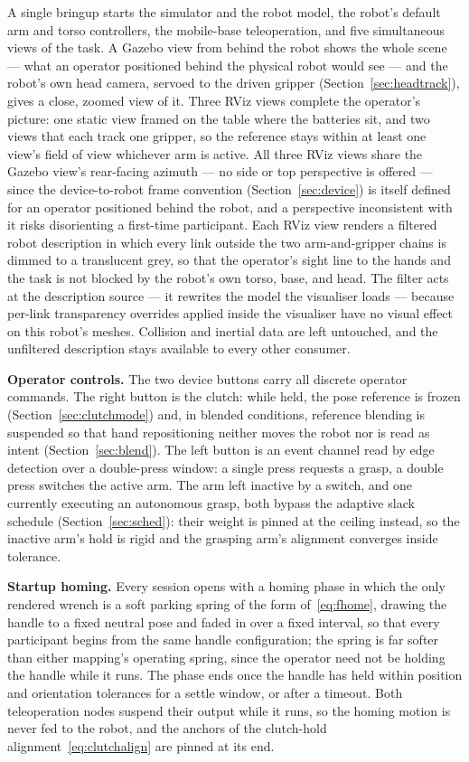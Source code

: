 \documentclass[12pt,a4paper,twoside,openright]{report}
\begin{document}
A single bringup starts the simulator and the robot model, the robot's default arm and torso controllers, the mobile-base teleoperation, and five simultaneous views of the task. A Gazebo view from behind the robot shows the whole scene --- what an operator positioned behind the physical robot would see --- and the robot's own head camera, servoed to the driven gripper (Section~\ref{sec:headtrack}), gives a close, zoomed view of it. Three RViz views complete the operator's picture: one static view framed on the table where the batteries sit, and two views that each track one gripper, so the reference stays within at least one view's field of view whichever arm is active. All three RViz views share the Gazebo view's rear-facing azimuth --- no side or top perspective is offered --- since the device-to-robot frame convention (Section~\ref{sec:device}) is itself defined for an operator positioned behind the robot, and a perspective inconsistent with it risks disorienting a first-time participant. Each RViz view renders a filtered robot description in which every link outside the two arm-and-gripper chains is dimmed to a translucent grey, so that the operator's sight line to the hands and the task is not blocked by the robot's own torso, base, and head. The filter acts at the description source --- it rewrites the model the visualiser loads --- because per-link transparency overrides applied inside the visualiser have no visual effect on this robot's meshes. Collision and inertial data are left untouched, and the unfiltered description stays available to every other consumer.

\textbf{Operator controls.} The two device buttons carry all discrete operator commands. The right button is the clutch: while held, the pose reference is frozen (Section~\ref{sec:clutchmode}) and, in blended conditions, reference blending is suspended so that hand repositioning neither moves the robot nor is read as intent (Section~\ref{sec:blend}). The left button is an event channel read by edge detection over a double-press window: a single press requests a grasp, a double press switches the active arm. The arm left inactive by a switch, and one currently executing an autonomous grasp, both bypass the adaptive slack schedule (Section~\ref{sec:sched}): their weight is pinned at the ceiling instead, so the inactive arm's hold is rigid and the grasping arm's alignment converges inside tolerance.

\textbf{Startup homing.}
\label{sec:homing}
Every session opens with a homing phase in which the only rendered wrench is a soft parking spring of the form of~\eqref{eq:fhome}, drawing the handle to a fixed neutral pose and faded in over a fixed interval, so that every participant begins from the same handle configuration; the spring is far softer than either mapping's operating spring, since the operator need not be holding the handle while it runs. The phase ends once the handle has held within position and orientation tolerances for a settle window, or after a timeout. Both teleoperation nodes suspend their output while it runs, so the homing motion is never fed to the robot, and the anchors of the clutch-hold alignment~\eqref{eq:clutchalign} are pinned at its end.
\end{document}
